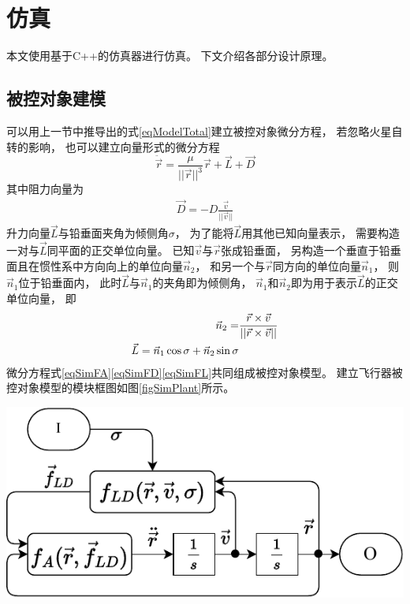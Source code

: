 \section{仿真}
本文使用基于C++的仿真器\cite{olzhn2021}进行仿真。
下文介绍各部分设计原理。

\subsection{被控对象建模}
可以用上一节中推导出的式\eqref{eqModelTotal}建立被控对象微分方程，
若忽略火星自转的影响，
也可以建立向量形式的微分方程
\begin{equation}
    \ddot{\vec{r}} = \frac{\mu}{||\vec{r}||^3}\vec{r}+\vec{L}+\vec{D} \label{eqSimFA}
\end{equation}
其中阻力向量为
\begin{align}
    \vec{D} = -D\frac{\vec{v}}{||\vec{v}||} \label{eqSimFD}
\end{align}
升力向量$\vec{L}$与铅垂面夹角为倾侧角$\sigma$，
为了能将$\vec{L}$用其他已知向量表示，
需要构造一对与$\vec{L}$同平面的正交单位向量。
已知$\vec{v}$与$\vec{r}$张成铅垂面，
另构造一个垂直于铅垂面且在惯性系中方向向上的单位向量$\vec{n}_2$，
和另一个与$\vec{r}$同方向的单位向量$\vec{n}_1$，
则$\vec{n}_1$位于铅垂面内，
此时$\vec{L}$与$\vec{n}_1$的夹角即为倾侧角，
$\vec{n}_1$和$\vec{n}_2$即为用于表示$\vec{L}$的正交单位向量，
即
\begin{align}
    \vec{n}_2 =& \frac{\vec{r}\times\vec{v}}{||\vec{r}\times\vec{v}||} \notag\\
    \vec{L}=\vec{n}_1\cos\sigma + \vec{n}_2\sin\sigma \label{eqSimFL}
\end{align}
微分方程式\eqref{eqSimFA}\eqref{eqSimFD}\eqref{eqSimFL}共同组成被控对象模型。
建立飞行器被控对象模型的模块框图如图\ref{figSimPlant}所示。
\begin{center}
	\includegraphics[scale=0.8]{plant.pdf}  \\
	\label{figSimPlant}
\end{center}
